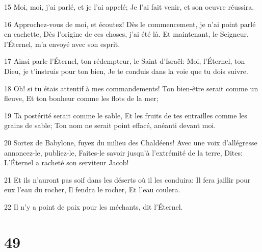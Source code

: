 \par 15 Moi, moi, j'ai parlé, et je l'ai appelé; Je l'ai fait venir, et son oeuvre réussira.
\par 16 Approchez-vous de moi, et écoutez! Dès le commencement, je n'ai point parlé en cachette, Dès l'origine de ces choses, j'ai été là. Et maintenant, le Seigneur, l'Éternel, m'a envoyé avec son esprit.
\par 17 Ainsi parle l'Éternel, ton rédempteur, le Saint d'Israël: Moi, l'Éternel, ton Dieu, je t'instruis pour ton bien, Je te conduis dans la voie que tu dois suivre.
\par 18 Oh! si tu étais attentif à mes commandements! Ton bien-être serait comme un fleuve, Et ton bonheur comme les flots de la mer;
\par 19 Ta postérité serait comme le sable, Et les fruits de tes entrailles comme les grains de sable; Ton nom ne serait point effacé, anéanti devant moi.
\par 20 Sortez de Babylone, fuyez du milieu des Chaldéens! Avec une voix d'allégresse annoncez-le, publiez-le, Faites-le savoir jusqu'à l'extrémité de la terre, Dites: L'Éternel a racheté son serviteur Jacob!
\par 21 Et ils n'auront pas soif dans les déserts où il les conduira: Il fera jaillir pour eux l'eau du rocher, Il fendra le rocher, Et l'eau coulera.
\par 22 Il n'y a point de paix pour les méchants, dit l'Éternel.

\chapter{49}

